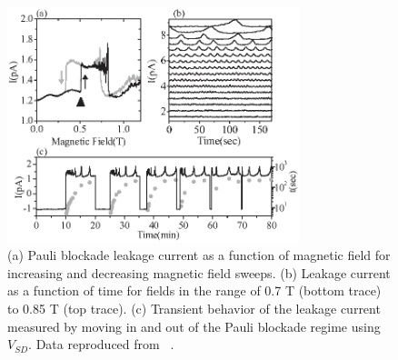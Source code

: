 \documentclass[rmp,twocolumn,aps]{revtex4}
\begin{document}
\begin{figure}[htb]
\includegraphics[width=8.5cm]{hanson_fig36.eps}
\caption{(a) Pauli blockade leakage current as a function of
magnetic field for increasing and decreasing magnetic field
sweeps. (b) Leakage current as a function of time for fields in
the range of 0.7 T (bottom trace) to 0.85 T (top trace). (c)
Transient behavior of the leakage current measured by moving in
and out of the Pauli blockade regime using $V_{SD}$. Data
reproduced from ~\textcite{OnoPRL2004}.} \label{Fig:OnoOsc}
\end{figure}
\end{document}

